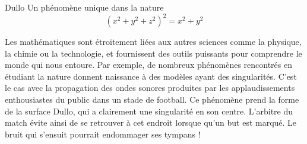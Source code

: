 \begin{surferPage}{Dullo}
Un phénomène unique dans la nature\\
\smallskip
\[(x^2+ y^2+ z^2)^2	= x^2+ y^2\]

\singlespacing
Les mathématiques sont étroitement liées aux autres sciences comme la physique, la chimie ou la technologie, et fournissent des outils puissants pour comprendre le monde qui nous entoure.
\singlespacing
Par exemple, de nombreux phénomènes rencontrés en étudiant la nature donnent naissance à des modèles ayant des singularités.
\singlespacing
C'est le cas avec la propagation des ondes sonores produites par les applaudissements enthousiastes du public dans un stade de football. Ce phénomène prend la forme de la surface Dullo, qui a clairement une singularité en son centre. L'arbitre du match évite ainsi de se retrouver à cet endroit lorsque qu'un but est marqué. Le bruit qui s'ensuit pourrait endommager ses tympans !
\end{surferPage}
